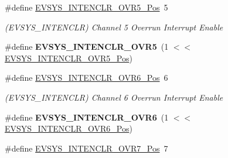 \begin{DoxyCompactItemize}
\item 
\hypertarget{group___s_a_m_l21___e_v_s_y_s_ga254adb8cc084fad93da103b2bbc1db5a}{}\#define \hyperlink{group___s_a_m_l21___e_v_s_y_s_ga254adb8cc084fad93da103b2bbc1db5a}{E\+V\+S\+Y\+S\+\_\+\+I\+N\+T\+E\+N\+C\+L\+R\+\_\+\+O\+V\+R5\+\_\+\+Pos}~5\label{group___s_a_m_l21___e_v_s_y_s_ga254adb8cc084fad93da103b2bbc1db5a}

\begin{DoxyCompactList}\small\item\em (E\+V\+S\+Y\+S\+\_\+\+I\+N\+T\+E\+N\+C\+L\+R) Channel 5 Overrun Interrupt Enable \end{DoxyCompactList}\item 
\hypertarget{group___s_a_m_l21___e_v_s_y_s_ga7859517868e8728bdb7a39e395e3d946}{}\#define {\bfseries E\+V\+S\+Y\+S\+\_\+\+I\+N\+T\+E\+N\+C\+L\+R\+\_\+\+O\+V\+R5}~(1 $<$$<$ \hyperlink{group___s_a_m_l21___e_v_s_y_s_ga254adb8cc084fad93da103b2bbc1db5a}{E\+V\+S\+Y\+S\+\_\+\+I\+N\+T\+E\+N\+C\+L\+R\+\_\+\+O\+V\+R5\+\_\+\+Pos})\label{group___s_a_m_l21___e_v_s_y_s_ga7859517868e8728bdb7a39e395e3d946}

\item 
\hypertarget{group___s_a_m_l21___e_v_s_y_s_ga5c84ff7f07eec354cc4f519670112669}{}\#define \hyperlink{group___s_a_m_l21___e_v_s_y_s_ga5c84ff7f07eec354cc4f519670112669}{E\+V\+S\+Y\+S\+\_\+\+I\+N\+T\+E\+N\+C\+L\+R\+\_\+\+O\+V\+R6\+\_\+\+Pos}~6\label{group___s_a_m_l21___e_v_s_y_s_ga5c84ff7f07eec354cc4f519670112669}

\begin{DoxyCompactList}\small\item\em (E\+V\+S\+Y\+S\+\_\+\+I\+N\+T\+E\+N\+C\+L\+R) Channel 6 Overrun Interrupt Enable \end{DoxyCompactList}\item 
\hypertarget{group___s_a_m_l21___e_v_s_y_s_ga4ad42b4779754f5562ded76022296840}{}\#define {\bfseries E\+V\+S\+Y\+S\+\_\+\+I\+N\+T\+E\+N\+C\+L\+R\+\_\+\+O\+V\+R6}~(1 $<$$<$ \hyperlink{group___s_a_m_l21___e_v_s_y_s_ga5c84ff7f07eec354cc4f519670112669}{E\+V\+S\+Y\+S\+\_\+\+I\+N\+T\+E\+N\+C\+L\+R\+\_\+\+O\+V\+R6\+\_\+\+Pos})\label{group___s_a_m_l21___e_v_s_y_s_ga4ad42b4779754f5562ded76022296840}

\item 
\hypertarget{group___s_a_m_l21___e_v_s_y_s_gac509056e9b76f2bf5cdc1968b2a079eb}{}\#define \hyperlink{group___s_a_m_l21___e_v_s_y_s_gac509056e9b76f2bf5cdc1968b2a079eb}{E\+V\+S\+Y\+S\+\_\+\+I\+N\+T\+E\+N\+C\+L\+R\+\_\+\+O\+V\+R7\+\_\+\+Pos}~7\label{group___s_a_m_l21___e_v_s_y_s_gac509056e9b76f2bf5cdc1968b2a079eb}


\end{DoxyCompactItemize}
